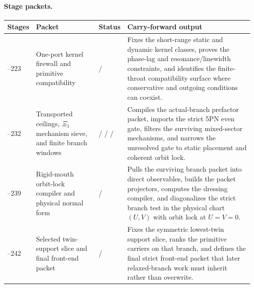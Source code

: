 \paragraph{Stage packets.}
\begin{center}
\small
\begin{tabular}{@{}>{\raggedright\arraybackslash}p{}>{\raggedright\arraybackslash}p{}>{\raggedright\arraybackslash}p{}>{\raggedright\arraybackslash}p{}@{}}
\toprule
Stages & Packet & Status & Carry-forward output \\
\midrule
219--223 & One-port kernel firewall and primitive compatibility & \StatusExactClosure{} / \StatusNumerical{} & Fixes the short-range static and dynamic kernel classes, proves the phase-lag and resonance/linewidth constraints, and identifies the finite-throat compatibility surface where conservative and outgoing conditions can coexist. \\
\addlinespace
224--232 & Transported ceilings, \(\Xi_1\) mechanism sieve, and finite branch windows & \StatusExactClosure{} / \StatusReduced{} / \StatusNumerical{} / \StatusOpen{} & Compiles the actual-branch prefactor packet, imports the strict 5PN even gate, filters the surviving mixed-sector mechanisms, and narrows the unresolved gate to static placement and coherent orbit lock. \\
\addlinespace
233--239 & Rigid-mouth orbit-lock compiler and physical normal form & \StatusExactClosure{} / \StatusOpen{} & Pulls the surviving branch packet into direct observables, builds the packet projectors, computes the dressing compiler, and diagonalizes the strict branch test in the physical chart \((U,V)\) with orbit lock at \(U=V=0\). \\
\addlinespace
240--242 & Selected twin-support slice and final front-end packet & \StatusExactClosure{} / \StatusOpen{} & Fixes the symmetric lowest-twin support slice, ranks the primitive carriers on that branch, and defines the final strict front-end packet that later relaxed-branch work must inherit rather than overwrite. \\
\bottomrule
\end{tabular}
\end{center}


